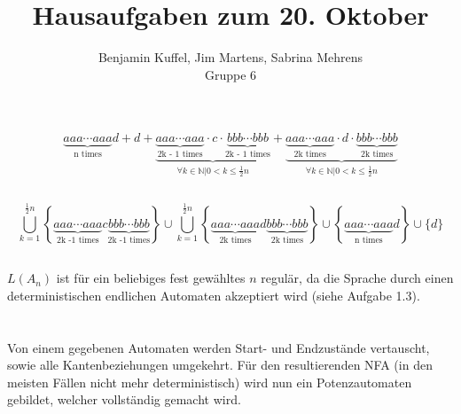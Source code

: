 \documentclass[10pt,a4paper,oneside,ngerman,numbers=noenddot]{scrartcl}
\begin{document}
\author{Benjamin Kuffel, Jim Martens, Sabrina Mehrens\\Gruppe 6}
\title{Hausaufgaben zum 20. Oktober}
\maketitle

\setcounter{section}{2}
\section{} %
	\subsection{} %
	\[\underbrace{aaa \cdots aaa}_{\text{n times}}d + d + \underbrace{\underbrace{aaa \cdots aaa}_{\text{2k - 1 times}} \cdot c \cdot \underbrace{bbb \cdots bbb}_{\text{2k - 1 times}}}_{\forall k \in \mathbb{N}| 0 < k \leq \frac{1}{2}n} + \underbrace{\underbrace{aaa \cdots aaa}_{\text{2k times}} \cdot d \cdot \underbrace{bbb \cdots bbb}_{\text{2k times}}}_{\forall k \in \mathbb{N}| 0 < k \leq \frac{1}{2}n}\]
	\subsection{}
	\[\bigcup\limits_{k = 1}^{\frac{1}{2}n} \left\lbrace \underbrace{aaa \cdots aaa}_{\text{2k -1 times}} c \underbrace{bbb \cdots bbb}_{\text{2k -1 times}}\right\rbrace \cup \bigcup\limits_{k = 1}^{\frac{1}{2}n} \left\lbrace \underbrace{aaa \cdots aaa}_{\text{2k times}} d \underbrace{bbb \cdots bbb}_{\text{2k times}}\right\rbrace \cup \left\lbrace \underbrace{aaa \cdots aaa}_{\text{n times}}d\right\rbrace \cup \{d\}\]
	\subsection{}
	\subsection{}
	\(L(A_{n})\) ist für ein beliebiges fest gewähltes \(n\) regulär, da die Sprache durch einen deterministischen endlichen Automaten akzeptiert wird (siehe Aufgabe 1.3).
\section{} %
\label{sec:14}
	\subsection{}
	Von einem gegebenen Automaten werden Start- und Endzustände vertauscht, sowie alle Kantenbeziehungen umgekehrt. Für den resultierenden NFA (in den meisten Fällen nicht mehr deterministisch) wird nun ein Potenzautomaten gebildet, welcher vollständig gemacht wird.
\end{document}
